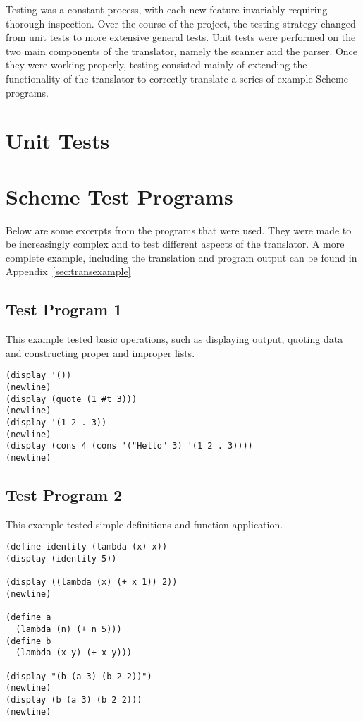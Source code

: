 Testing was a constant process, with each new feature invariably requiring
thorough inspection. Over the course of the project, the testing strategy
changed from unit tests to more extensive general tests. Unit tests were
performed on the two main components of the translator, namely the scanner and
the parser. Once they were working properly, testing consisted mainly of
extending the functionality of the translator to correctly translate a series of
example Scheme programs.


\section{Unit Tests}


\section{Scheme Test Programs}

Below are some excerpts from the programs that were used. They were made to be
increasingly complex and to test different aspects of the translator. A more
complete example, including the translation and program output can be found in
Appendix~\ref{sec:transexample}

\subsection{Test Program 1}
This example tested basic operations, such as displaying output, quoting data
and constructing proper and improper lists.
\begin{framed}
\begin{verbatim}
(display '())
(newline)
(display (quote (1 #t 3)))
(newline)
(display '(1 2 . 3))
(newline)
(display (cons 4 (cons '("Hello" 3) '(1 2 . 3))))
(newline)
\end{verbatim}
\end{framed}

\subsection{Test Program 2}
This example tested simple definitions and function application.
\begin{framed}
\begin{verbatim}
(define identity (lambda (x) x))
(display (identity 5))

(display ((lambda (x) (+ x 1)) 2))
(newline)

(define a
  (lambda (n) (+ n 5)))
(define b
  (lambda (x y) (+ x y)))

(display "(b (a 3) (b 2 2))")
(newline)
(display (b (a 3) (b 2 2)))
(newline)
\end{verbatim}
\end{framed}

